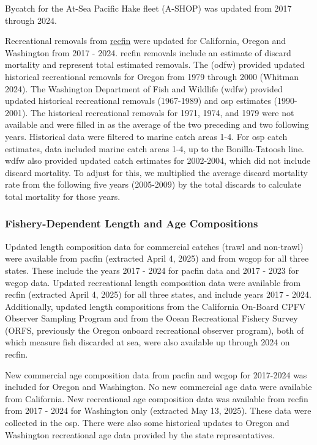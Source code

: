 \documentclass[
]{scrartcl}
\begin{document}
Bycatch for the At-Sea Pacific Hake fleet (A-SHOP) was updated from 2017
through 2024.

Recreational removals from \href{www.recfin.org}{\gls{recfin}} were
updated for California, Oregon and Washington from 2017 - 2024.
\gls{recfin} removals include an estimate of discard mortality and
represent total estimated removals. The (\gls{odfw}) provided updated
historical recreational removals for Oregon from 1979 through 2000
(Whitman 2024). The Washington Department of Fish and Wildlife
(\gls{wdfw}) provided updated historical recreational removals
(1967-1989) and \gls{osp} estimates (1990-2001). The historical
recreational removals for 1971, 1974, and 1979 were not available and
were filled in as the average of the two preceding and two following
years. Historical data were filtered to marine catch areas 1-4. For
\gls{osp} catch estimates, data included marine catch areas 1-4, up to
the Bonilla-Tatoosh line. \gls{wdfw} also provided updated catch
estimates for 2002-2004, which did not include discard mortality. To
adjust for this, we multiplied the average discard mortality rate from
the following five years (2005-2009) by the total discards to calculate
total mortality for those years.

\subsubsection{Fishery-Dependent Length and Age
Compositions}\label{sec-fd_comps}

Updated length composition data for commercial catches (trawl and
non-trawl) were available from \gls{pacfin} (extracted April 4, 2025)
and from \gls{wcgop} for all three states. These include the years 2017
- 2024 for \gls{pacfin} data and 2017 - 2023 for \gls{wcgop} data.
Updated recreational length composition data were available from
\gls{recfin} (extracted April 4, 2025) for all three states, and include
years 2017 - 2024. Additionally, updated length compositions from the
California On-Board CPFV Observer Sampling Program and from the Ocean
Recreational Fishery Survey (ORFS, previously the Oregon onboard
recreational observer program), both of which measure fish discarded at
sea, were also available up through 2024 on \gls{recfin}.

New commercial age composition data from \gls{pacfin} and \gls{wcgop}
for 2017-2024 was included for Oregon and Washington. No new commercial
age data were available from California. New recreational age
composition data was available from \gls{recfin} from 2017 - 2024 for
Washington only (extracted May 13, 2025). These data were collected in
the \gls{osp}. There were also some historical updates to Oregon and
Washington recreational age data provided by the state representatives.
\end{document}
